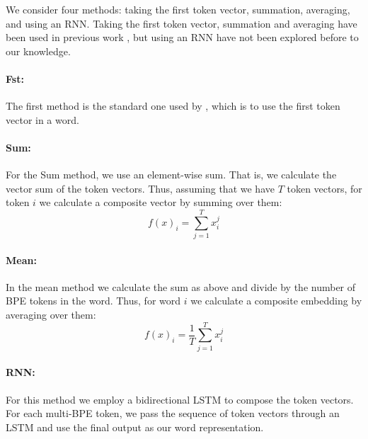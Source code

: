 \documentclass[11pt]{article}
\newcommand\jp[1]{(\textbf{JP:} #1)}
\newcommand\citet{\newcite}
\newcommand\citep{\cite}
\begin{document}

                    We consider four methods: taking the first
     token vector, summation, averaging, and using an RNN. Taking the first
     token vector, summation and averaging have been used in previous
     work \citep{sachan2020syntax,kondratyuk2019cross,devlin2018bert},
     but using an RNN have not been explored before to our knowledge.

        \paragraph{Fst:} The first method is the standard one used by
     \citet{devlin2018bert}, which is to use the first token vector in a word.
    
     \paragraph{Sum:} For the Sum method, we use an element-wise
     sum. That is, we calculate the vector sum of the token
     vectors. Thus, assuming that we have $T$ token vectors, for token $i$ we calculate a composite vector
     by summing over them:
	\begin{equation}
	f(x)_i = \sum_{j=1}^{T} x_i^j
	\end{equation}

     \paragraph{Mean:} In the mean method we calculate the sum as above and
     divide by the number of BPE tokens in the word. Thus, for
     word $i$ we calculate a composite embedding by averaging over
     them:
	\begin{equation}
	f(x)_{i} = \frac{1}{T}\sum_{j=1}^{T} x_i^j
	\end{equation}
	
	
     \paragraph{RNN:} For this method we employ a bidirectional
     LSTM to compose the token vectors. For each multi-BPE token, we
     pass the sequence of token vectors through an LSTM and use the
     final output as our word representation.
\end{document}
